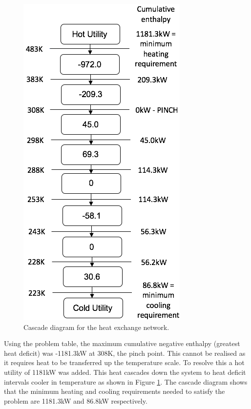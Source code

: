 \documentclass[11pt, oneside]{article}
\begin{document}
\begin{figure}
\includegraphics[width=0.9\linewidth]{./pictures/cascadediagram2} 
\caption{Cascade diagram for the heat exchange network.}
\label{fig:cascade}
\end{figure}
Using the problem table, the maximum cumulative negative enthalpy (greatest heat deficit) was -1181.3kW at 308K, the pinch point. This cannot be realised as it requires heat to be transferred up the temperature scale. To resolve this a hot utility of 1181kW was added. This heat cascades down the system to heat deficit intervals cooler in temperature as shown in Figure \ref{fig:cascade}. The cascade diagram shows that the minimum heating and cooling requirements needed to satisfy the problem are 1181.3kW and 86.8kW respectively.
\end{document}
